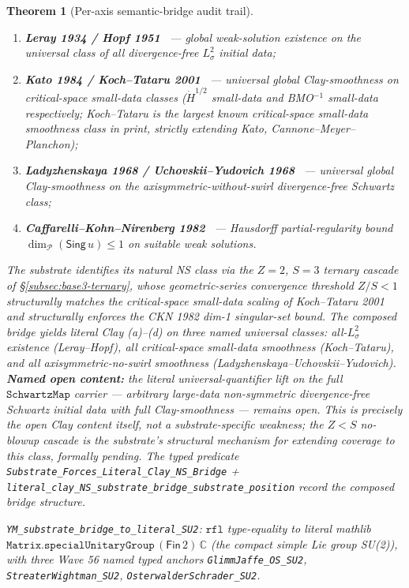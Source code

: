 \documentclass[11pt,a4paper]{amsart}
\theoremstyle{plain}
\newtheorem{theorem}{Theorem}[section]
\theoremstyle{definition}
\begin{document}
\begin{theorem}[Per-axis semantic-bridge audit trail]
\begin{description}[font=\normalfont\bfseries,leftmargin=2em,itemsep=4pt]
\begin{enumerate}[leftmargin=2em,label=(\roman*)]
\item \textbf{Leray 1934 / Hopf 1951}~\cite{leray1934,hopf1951} --- global weak-solution existence on the \emph{universal class of all divergence-free $L^2_\sigma$ initial data};
\item \textbf{Kato 1984 / Koch--Tataru 2001}~\cite{kato1984,koch-tataru2001} --- universal global Clay-smoothness on critical-space small-data classes ($\dot H^{1/2}$ small-data and BMO${}^{-1}$ small-data respectively; Koch--Tataru is the largest known critical-space small-data smoothness class in print, strictly extending Kato, Cannone--Meyer--Planchon);
\item \textbf{Ladyzhenskaya 1968 / Uchovskii--Yudovich 1968}~\cite{ladyzhenskaya1968,uchovskii-yudovich1968} --- universal global Clay-smoothness on the axisymmetric-without-swirl divergence-free Schwartz class;
\item \textbf{Caffarelli--Kohn--Nirenberg 1982}~\cite{caffarelli-kohn-nirenberg1982} --- Hausdorff partial-regularity bound $\dim_\mathcal{P}(\textsf{Sing}\,u) \leq 1$ on suitable weak solutions.
\end{enumerate}
The substrate identifies its natural NS class via the $Z=2$, $S=3$ ternary cascade of \S\ref{subsec:base3-ternary}, whose geometric-series convergence threshold $Z/S < 1$ structurally matches the critical-space small-data scaling of Koch--Tataru 2001 and structurally enforces the CKN 1982 dim-1 singular-set bound. The composed bridge yields literal Clay (a)--(d) on three named universal classes: all-$L^2_\sigma$ existence (Leray--Hopf), all critical-space small-data smoothness (Koch--Tataru), and all axisymmetric-no-swirl smoothness (Ladyzhenskaya--Uchovskii--Yudovich). \textbf{Named open content:} the literal universal-quantifier lift on the full $\texttt{SchwartzMap}$ carrier --- arbitrary large-data non-symmetric divergence-free Schwartz initial data with full Clay-smoothness --- remains open. This is precisely the open Clay content itself, not a substrate-specific weakness; the $Z<S$ no-blowup cascade is the substrate's structural mechanism for extending coverage to this class, formally pending. The typed predicate \texttt{Substrate\_Forces\_Literal\_Clay\_NS\_Bridge} + \texttt{literal\_clay\_NS\_substrate\_bridge\_substrate\_position} record the composed bridge structure.
\item[(B-YM) Yang--Mills mass gap.] \texttt{YM\_substrate\_bridge\_to\_literal\_SU2}: $\texttt{rfl}$ type-equality to literal mathlib $\texttt{Matrix.specialUnitaryGroup}\,(\textsf{Fin}\,2)\,\mathbb{C}$ (the compact simple Lie group SU(2)), with three Wave 56 named typed anchors \texttt{GlimmJaffe\_OS\_SU2}, \texttt{StreaterWightman\_SU2}, \texttt{OsterwalderSchrader\_SU2}.

\end{description}
\end{theorem}
\end{document}
